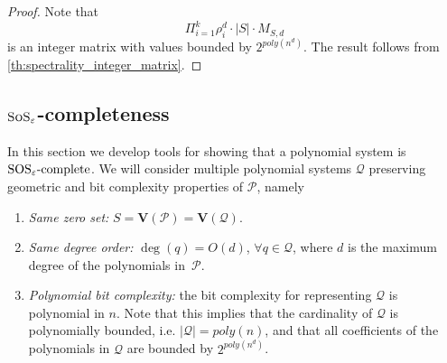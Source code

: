 \documentclass[11pt]{article}
\newcommand{\sos}{\text{\sc{SoS}}}
\newcommand{\Variety}[1]{{\textbf{V}}\left( #1 \right)}
\newcommand{\1}{\textbf{1}}
\newcommand{\SOSe}{\rm{SOS}_\varepsilon\text{-complete}}
\begin{document}
\begin{proof}
    Note that
    \begin{equation*}
       \Pi_{i=1}^k \rho_i^d \cdot |S| \cdot M_{S,d}
    \end{equation*}
    is an integer matrix with values bounded by $2^{poly(n^d)}$. The result follows from \cref{th:spectrality_integer_matrix}.
\end{proof}

\subsection[SoS epsilon completeness]{$\sos_\varepsilon$-completeness}\label{sect:SOS_completeness}
In this section we develop tools for showing that a polynomial system is $\SOSe$.
We will consider multiple polynomial systems $\mathcal{Q}$ preserving geometric and bit complexity properties of $\mathcal{P}$, namely
\begin{enumerate}[label=A\arabic*.]
    \item \label{assumption_1} \textit{Same zero set:} $S = \Variety{\mathcal{P}} = \Variety{\mathcal{Q}}$.
    \item \label{assumption_2} \textit{Same degree order:} $\deg(q) = O(d)$, $ \forall q \in \mathcal{Q}$, where $d$ is the maximum degree of the polynomials in~$\mathcal{P}$.
    \item \label{assumption_3} \textit{Polynomial bit complexity:} the bit complexity for representing $\mathcal{Q}$ is polynomial in $n$. Note that this implies that the cardinality of $\mathcal{Q}$ is polynomially bounded, i.e. $|\mathcal{Q}| = poly(n)$, and that all coefficients of the polynomials in $\mathcal{Q}$ are bounded by $2^{poly(n^d)}$.
\end{enumerate}
\end{document}
